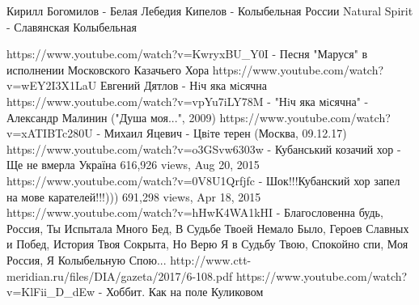  
 

Кирилл Богомилов - Белая Лебедия
Кипелов - Колыбельная России
Natural Spirit - Славянская Колыбельная

https://www.youtube.com/watch?v=KwryxBU_Y0I - Песня "Маруся" в исполнении Московского Казачьего Хора
https://www.youtube.com/watch?v=wEY2I3X1LaU Евгений Дятлов - Нiч яка мiсячна
https://www.youtube.com/watch?v=vpYu7iLY78M - "Нiч яка мiсячна" - Александр Малинин ("Душа моя...", 2009)
https://www.youtube.com/watch?v=xATIBTc280U - Михаил Яцевич - Цвiте терен (Москва, 09.12.17)
https://www.youtube.com/watch?v=o3GSvw6303w - Кубанський козачий хор - Ще не вмерла Україна
616,926 views, Aug 20, 2015
https://www.youtube.com/watch?v=0V8U1Qrfjfc - Шок!!!Кубанский хор запел на мове карателей!!!)))
691,298 views, Apr 18, 2015
https://www.youtube.com/watch?v=hHwK4WA1kHI - Благословенна будь, Россия, Ты Испытала Много Бед,
В Судьбе Твоей Немало Было, Героев Славных и Побед, История Твоя Сокрыта, Но Верю Я в Судьбу Твою,
Спокойно спи, Моя Россия, Я Колыбельную Спою...
http://www.ctt-meridian.ru/files/DIA/gazeta/2017/6-108.pdf
https://www.youtube.com/watch?v=KlFii_D_dEw - Хоббит. Как на поле Куликовом
